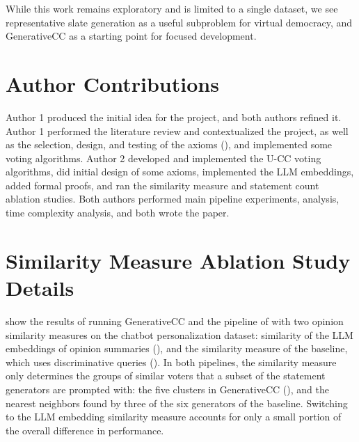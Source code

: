 \documentclass[letterpaper]{article} %
\begin{document}
While this work remains exploratory and is limited to a single dataset, we see representative slate generation as a useful subproblem for virtual democracy, and GenerativeCC as a starting point for focused development.




\appendix


\section{Author Contributions}

Author 1 produced the initial idea for the project, and both authors refined it.
Author 1 performed the literature review and contextualized the project, as well as the selection, design, and testing of the axioms (), and implemented some voting algorithms.
Author 2 developed and implemented the \textsc{U-CC} voting algorithms, did initial design of some axioms, implemented the LLM embeddings, added formal proofs, and ran the similarity measure and statement count ablation studies.
Both authors performed main pipeline experiments, analysis, time complexity analysis, and both wrote the paper.

\section{Similarity Measure Ablation Study Details}
\label{app:embedding-ablation-details}

 show the results of running GenerativeCC and the pipeline of \citet{fish-v2} with two opinion similarity measures on the chatbot personalization dataset: similarity of the LLM embeddings of opinion summaries (), and the similarity measure of the baseline, which uses discriminative queries ().
In both pipelines, the similarity measure only determines the groups of similar voters that a subset of the statement generators are prompted with: the five clusters in GenerativeCC (), and the nearest neighbors found by three of the six generators of the baseline.
Switching to the LLM embedding similarity measure accounts for only a small portion of the overall difference in performance.
\end{document}
